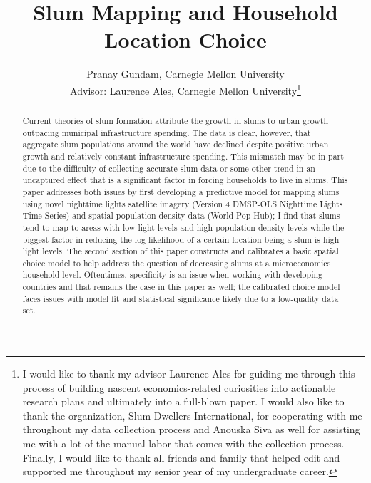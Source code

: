 \documentclass[11pt,english]{article}
\title{\textbf{Slum Mapping and Household Location Choice}}
\author{Pranay Gundam, Carnegie Mellon University \\[1cm]{\small Advisor: Laurence Ales, Carnegie Mellon University\footnote{I would like to thank my advisor Laurence Ales for guiding me through this process of building nascent economics-related curiosities into actionable research plans and ultimately into a full-blown paper. I would also like to thank the organization, Slum Dwellers International, for cooperating with me throughout my data collection process and Anouska Siva as well for assisting me with a lot of the manual labor that comes with the collection process. Finally, I would like to thank all friends and family that helped edit and supported me throughout my senior year of my undergraduate career.}}}
\begin{document}
\maketitle


\begin{abstract}
Current theories of slum formation attribute the growth in slums to urban growth outpacing municipal infrastructure spending. The data is clear, however, that aggregate slum populations around the world have declined despite positive urban growth and relatively constant infrastructure spending. This mismatch may be in part due to the difficulty of collecting accurate slum data or some other trend in an uncaptured effect that is a significant factor in forcing households to live in slums. This paper addresses both issues by first developing a predictive model for mapping slums using novel nighttime lights satellite imagery (Version 4 DMSP-OLS Nighttime Lights Time Series) and spatial population density data (World Pop Hub); I find that slums tend to map to areas with low light levels and high population density levels while the biggest factor in reducing the log-likelihood of a certain location being a slum is high light levels. The second section of this paper constructs and calibrates a basic spatial choice model to help address the question of decreasing slums at a microeconomics household level. Oftentimes, specificity is an issue when working with developing countries and that remains the case in this paper as well; the calibrated choice model faces issues with model fit and statistical significance likely due to a low-quality data set.
\end{abstract}
\newpage


\newpage
\tableofcontents
\newpage





















\clearpage





\clearpage


\end{document}
